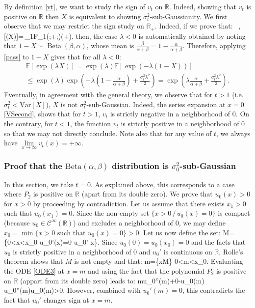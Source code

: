\documentclass[15pt]{article}
\newcommand{\E}{\mathbb{E}}
\def\E{\mathbb{E}}
\DeclareMathOperator{\Beta}{Beta}
\theoremstyle{plain}
\begin{document}
By definition \eqref{vt}, we want to study the sign of $v_t$ on $\mathbb{R}$. Indeed, showing that $v_t$ is positive on $\mathbb{R}$ then $X$ is equivalent to showing $\sigma_t^2$-sub-Gaussianity. We first observe that we may restrict the sign study on $\mathbb{R}_+$. Indeed, if we prove that: 
\beq \label{pass}\forall \,\lambda{}\,\,,\,\, \E[\exp(\lambda X)]=\,_1F_1(\alpha;\alpha+\beta;\lambda)\leq\exp\left(\frac{\lambda \alpha}{\alpha+\beta}+\right).\eeq
then, the case $\lambda<0$ is automatically obtained by noting that $1-X\sim\Beta(\beta,\alpha)$, whose mean is $\frac{\beta}{\alpha+\beta} = 1-\frac{\alpha}{\alpha+\beta}$. Therefore, applying \eqref{pass} to $1-X$ gives that for all $\lambda<0$:
\begin{multline*}
	\E[\exp(\lambda X)]=\exp(\lambda)\E[\exp(-\lambda (1-X))]\\
\leq \exp(\lambda)\exp\left(-\lambda (1-\frac{\alpha}{\alpha+\beta})+\frac{\sigma_t^2\lambda^2}{2}\right)=\exp\left(\lambda \frac{\alpha}{\alpha+\beta}+\frac{\sigma_t^2\lambda^2}{2}\right).
\end{multline*}
Eventually, in agreement with the general theory, we observe that for $t>1$ (i.e. $\sigma^2_t<\text{Var}[X]$), $X$ is not $\sigma_t^2$-sub-Gaussian. Indeed, the series expansion at $x=0$ \eqref{VSecond}, shows that for $t>1$, $v_t$ is strictly negative in a neighborhood of $0$. On the contrary, for $t<1$, the function $v_t$ is strictly positive in a neighborhood of $0$ so that we may not directly conclude. Note also that for any value of $t$, we always have $\underset{x\to \infty}{\lim}v_t(x)=+\infty$. 

\subsubsection{Proof that the $\text{Beta}(\alpha,\beta)$ distribution is $\sigma_0^2$-sub-Gaussian\label{SecSigma0}}
In this section, we take $t=0$. As explained above, this corresponds to a case where $P_2$ is positive on $\mathbb{R}$  (apart from its double zero). We prove that $u_0(x)>0$ for $x>0$ by proceeding by contradiction. Let us assume that there exists $x_1>0$ such that $u_0(x_1)=0$. Since the non-empty set $\{x>0 \,/\, u_0(x)=0\}$ is compact (because $u_0\in \mathcal{C}^\infty(\mathbb{R})$) and excludes a neighborhood of $0$, we may define $x_0=\min\{x>0 \text{ such that } u_0(x)=0\}>0$. Let us now define the set:
\beqq M=\{0<x<x_0  u_0'(x)=0  u_0'  x\}.\eeqq
Since $u_0(0)=u_0(x_0)=0$ and the facts that $u_0$ is strictly positive in a neighborhood of $0$ and $u_0'$ is continuous on $\mathbb{R}$, Rolle's theorem shows that $M$ is not empty and that:
\beqq m=\min\{x\in M\} 0<m<x_0.\eeqq
Evaluating the ODE \eqref{ODE3} at $x=m$ and using the fact that the polynomial $P_2$ is positive on $\mathbb{R}$ (appart from its double zero) leads to:
\beq\label{eq:FinalClue} mu_0''(m)+0-\alpha u_0(m) \,\Rightarrow \, u_0''(m)\geq {}u_0(m)>0.\eeq
However, combined with $u_0'(m)=0$, this contradicts the fact that $u_0'$ changes sign at $x=m$. 
\end{document}
